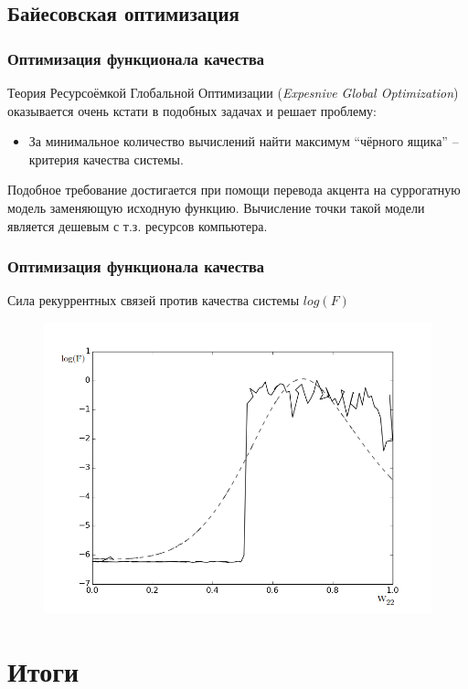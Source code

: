 \documentclass{beamer}
\begin{document}
\subsection{Байесовская оптимизация} 
\begin{frame}
\frametitle{Оптимизация функционала качества}
Теория Ресурсоёмкой Глобальной Оптимизации (\textit{Expesnive Global Optimization}\cite{ego-jones}) оказывается очень кстати в подобных задачах и решает проблему: \\
\begin{itemize}
\item За минимальное количество вычислений найти максимум ``чёрного ящика'' -- критерия качества системы.
\end{itemize}
Подобное требование достигается при помощи перевода акцента на суррогатную модель заменяющую исходную функцию. Вычисление точки такой модели является дешевым с т.з. ресурсов компьютера.
\end{frame}

\begin{frame}
\frametitle{Оптимизация функционала качества}
Сила рекуррентных связей против качества системы $log(F)$
\begin{figure}
   \includegraphics[scale=0.25]{rec_weights_fig.png}
\end{figure}
\end{frame}


\section{Итоги}
\frame{\tableofcontents[currentsection]}
\end{document}
